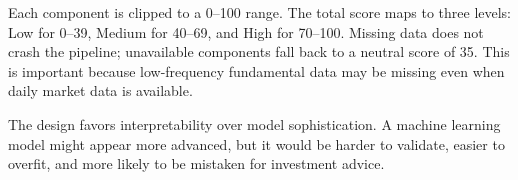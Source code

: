 Each component is clipped to a 0--100 range. The total score maps to three levels: Low for 0--39, Medium for 40--69, and High for 70--100. Missing data does not crash the pipeline; unavailable components fall back to a neutral score of 35. This is important because low-frequency fundamental data may be missing even when daily market data is available.

The design favors interpretability over model sophistication. A machine learning model might appear more advanced, but it would be harder to validate, easier to overfit, and more likely to be mistaken for investment advice.
